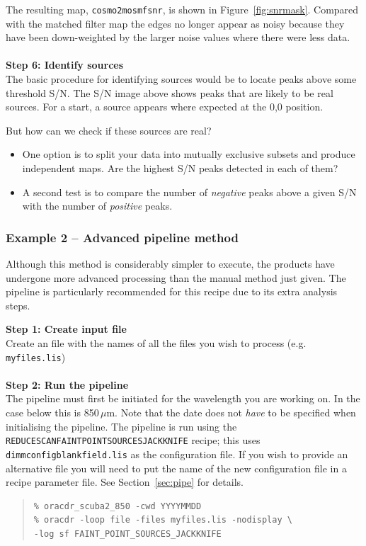 \documentclass[twoside,11pt]{article}
\newcommand{\htmlref}[2]{#1}
\newcommand{\latexhtml}[2]{#1}
\newcommand{\xref}[3]{#1}
\renewcommand{\_}{\texttt{\symbol{95}}}
\newenvironment{myquote}{
   \color{MidnightBlue}\begin{quote}\begin{small}}{
   \end{small}\end{quote}
}
\newcommand{\drrecipe}[1]{\texttt{#1}}
\newcommand{\file}[1]{\texttt{#1}}
\newcommand{\cref}[3]{\latexhtml{#1~\ref{#2}}{\htmlref{#3}{#2}}}
\renewenvironment{myquote}{
      \begin{quote}\begin{small}}{
      \end{small}\end{quote}
   }
\begin{document}
The resulting map, \file{cosmo2\_mos\_mf\_snr}, is shown in
\cref{Figure}{fig:snrmask}{the signal-to-noise image}. Compared with the
matched filter map the
edges no longer appear as noisy because they have been down-weighted
by the larger noise values where there were less data.
\\ \\
\textbf{Step 6: Identify sources}\\
The basic procedure for identifying sources would be to locate peaks
above some threshold S/N. The S/N image above shows peaks that are
likely to be real sources. For a start, a source appears where
expected at the 0,0 position.

But how can we check if these sources are real?
\begin{itemize}

\item One option is to split your data into mutually exclusive subsets
  and produce independent maps. Are the highest S/N peaks detected in each of
  them?
\item A second test is to compare the number of \emph{negative} peaks above
  a given S/N with the number of \emph{positive} peaks.
\end{itemize}

\subsubsection{Example 2 -- Advanced pipeline method}
\label{sec:jk}

Although this method is considerably simpler to execute, the products
have undergone more advanced processing than the manual method just
given. The pipeline is particularly recommended for this recipe due to
its extra analysis steps.

\textbf{Step 1: Create input file}\\
Create an file with the names of all the files you wish to process (e.g.
\file{myfiles.lis})
\\ \\
\textbf{Step 2: Run the pipeline}\\
The pipeline must first be initiated for the wavelength you are
working on. In the case below this is 850\,$\mu$m. Note that the date
does not \emph{have} to be specified when initialising the pipeline.
The pipeline is run using the
\xref{\drrecipe{REDUCE\_SCAN\_FAINT\_POINT\_SOURCES\_JACKKNIFE}}{sun264}{REDUCE_SCAN_FAINT_POINT_SOURCES_JACKKNIFE}
recipe; this uses \file{dimmconfig\_blank\_field.lis} as the
configuration file. If you wish to provide an alternative file you
will need to put the name of the new configuration file in a recipe
parameter file.  See \cref{Section}{sec:pipe}{The SCUBA-2 Pipeline}
for details.
\begin{myquote}
\begin{verbatim}
% oracdr_scuba2_850 -cwd YYYYMMDD
% oracdr -loop file -files myfiles.lis -nodisplay \
-log sf FAINT_POINT_SOURCES_JACKKNIFE
\end{verbatim}
\end{myquote}
\end{document}
